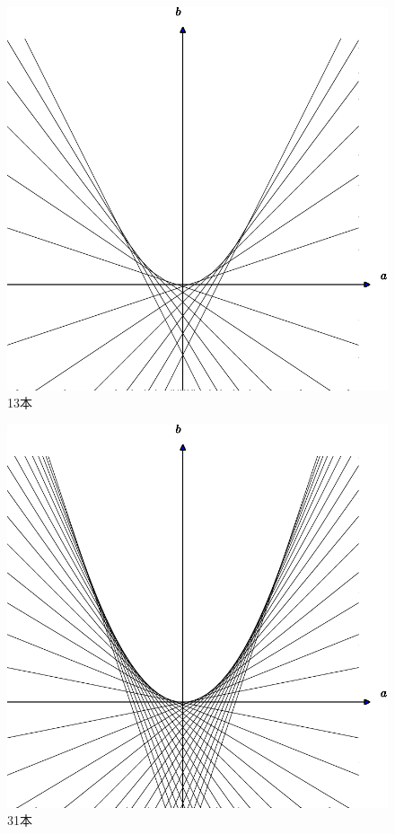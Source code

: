 \documentclass[11pt,a4j,fleqn]{jarticle}
\begin{document}
\begin{figure}[p]
 \centering
 \includegraphics[scale=0.7]{envelope0.pdf}
 \caption{13本}
 \label{fig:1}
\end{figure}

\begin{figure}[p]
 \centering
 \includegraphics[scale=0.7]{envelope1.pdf}
 \caption{31本}
 \label{fig:2}
\end{figure}
\end{document}
